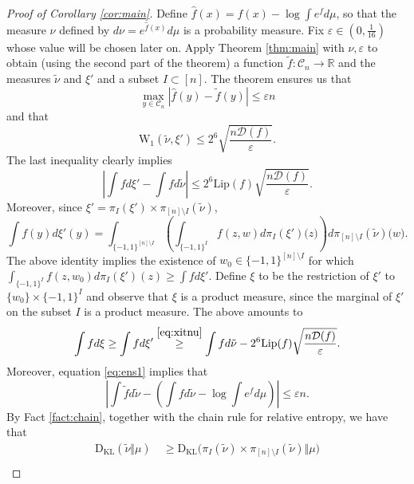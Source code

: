\documentclass[12pt]{article}
\def \W{\mathrm{W_1}}
\def \RR {\mathbb R}
\def \eps {\varepsilon}
\def \Lip {\mathrm {Lip}}
\def \DC {\mathcal{C}_n}
\def \KL {\mathrm{D}_{\mathrm{KL}}}
\def \Comp { \mathcal{D} }
\theoremstyle{definition}
\theoremstyle{remark}
\begin{document}
\begin{proof} [Proof of Corollary \ref{cor:main}]
	Define $\hat f(x) = f(x) - \log \int e^{f} d \mu$, so that the measure $\nu$ defined by $d \nu = e^{\hat f(x)} d \mu$ is a probability measure. 
	Fix $\eps \in (0, \tfrac{1}{16})$ whose value will be chosen later on. Apply Theorem \ref{thm:main} with $\nu, \eps$ to obtain (using the second part of the theorem) a function $\tilde f: \DC \to \RR$ and the measures $\tilde \nu$ and $\xi'$ and a subset $I \subset [n]$. The theorem ensures us that
	\begin{equation}\label{eq:ens1}
	\max_{y \in \DC} | \hat f(y)-\tilde f(y)| \leq \eps n
	\end{equation}
	and that
	$$
	\W(\tilde \nu, \xi') \leq 2^6 \sqrt{\frac{n \Comp(f)}{\eps}}.
	$$				
	The last inequality clearly implies
	\begin{equation}\label{eq:xitnu}
	\left |\int f d \xi' - \int f d \tilde \nu \right | \leq 2^6 \Lip(f) \sqrt{\frac{n \Comp(f)}{\eps}}.
	\end{equation}
	Moreover, since $\xi' = \pi_I(\xi') \times \pi_{[n] \setminus I}(\tilde \nu)$,
	$$
	\int f (y) d \xi'(y) = \int_{\{-1,1\}^{[n] \setminus I} } \left (\int_{\{-1,1\}^{I}} f (z,w) d \pi_I (\xi' ) \bigl (z \bigr) \right ) d \pi_{[n] \setminus I}  ( \tilde \nu ) \bigl (w \bigr ).
	$$ 
	The above identity implies the existence of $w_0 \in \{-1,1\}^{ [n] \setminus I }$ for which $\int_{\{-1,1\}^I} f(z,w_0) d \pi_I (\xi') (z) \geq \int f d \xi'$.
	Define $\xi$ to be the restriction of $\xi'$ to $\{w_0\} \times \{-1,1\}^{I}$ and observe that $\xi$ is a product measure, since the marginal of $\xi'$ on the subset $I$ is a product measure. The above amounts to
	$$
	\int f d \xi \geq \int f d \xi' \stackrel{\eqref{eq:xitnu}}{\geq} \int f d \tilde \nu - 2^6 \Lip(f) \sqrt{\frac{n \Comp(f)}{\eps}}.
	$$
	Moreover, equation \eqref{eq:ens1} implies that
	$$
	\left |\int \tilde f d \tilde \nu - \left (\int f d \tilde \nu - \log \int e^{f} d \mu \right ) \right | \leq \eps n.
	$$
	By Fact \ref{fact:chain}, together with the chain rule for relative entropy, we have that
	\begin{align*}
	\KL(\tilde \nu \Vert \mu) ~& \geq \KL \bigl (\pi_I(\tilde \nu) \times \pi_{[n] \setminus I}(\tilde \nu) \Vert \mu \bigr)  \\

\end{align*}
\end{proof}
\end{document}
